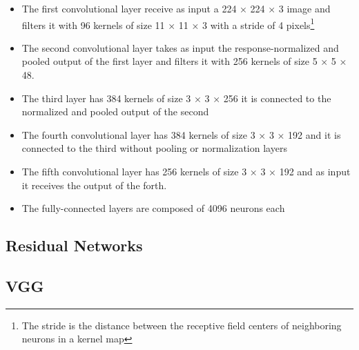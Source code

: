 \begin{itemize}
\item The first convolutional layer receive as input a 224 × 224 × 3  image and filters it with 96 kernels of size 11 × 11 × 3 with a stride of 4 pixels\footnote{The stride is the distance between the receptive field centers of neighboring neurons in a kernel map}
\item The second convolutional layer takes as input the response-normalized and pooled output of the first layer and filters it with 256 kernels of size 5 × 5 × 48.
\item The third layer has 384 kernels of size 3 × 3 × 256 it is connected to the normalized and pooled output of the second
\item The fourth convolutional layer has 384 kernels of size 3 × 3 × 192 and it is connected to the third without pooling or normalization layers
\item The fifth convolutional layer has 256 kernels of size 3 × 3 × 192 and as input it receives the output of the forth. 
\item The fully-connected layers are composed of 4096 neurons each
\end{itemize}
\subsection{Residual Networks}
\subsection{VGG}